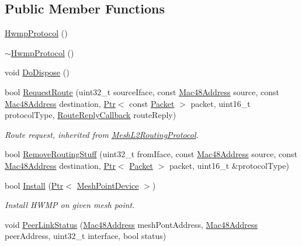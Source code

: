 \subsection*{Public Member Functions}
\begin{DoxyCompactItemize}
\item 
\hyperlink{classns3_1_1dot11s_1_1HwmpProtocol_afe4408ad645b5c3daebd66391fb27b9d}{Hwmp\+Protocol} ()
\item 
\hyperlink{classns3_1_1dot11s_1_1HwmpProtocol_acd6ad97112fd1b32f1d665376bb602cc}{$\sim$\+Hwmp\+Protocol} ()
\item 
void \hyperlink{classns3_1_1dot11s_1_1HwmpProtocol_aac4d06dc3a17b2afbe75104b78f1363a}{Do\+Dispose} ()
\item 
bool \hyperlink{classns3_1_1dot11s_1_1HwmpProtocol_aedaf2770cdde104e445b870fd9b37617}{Request\+Route} (uint32\+\_\+t source\+Iface, const \hyperlink{classns3_1_1Mac48Address}{Mac48\+Address} source, const \hyperlink{classns3_1_1Mac48Address}{Mac48\+Address} destination, \hyperlink{classns3_1_1Ptr}{Ptr}$<$ const \hyperlink{classns3_1_1Packet}{Packet} $>$ packet, uint16\+\_\+t protocol\+Type, \hyperlink{classns3_1_1MeshL2RoutingProtocol_a4c415efa22789b3a3bb5538b8fcf3e6a}{Route\+Reply\+Callback} route\+Reply)
\begin{DoxyCompactList}\small\item\em Route request, inherited from \hyperlink{classns3_1_1MeshL2RoutingProtocol}{Mesh\+L2\+Routing\+Protocol}. \end{DoxyCompactList}\item 
bool \hyperlink{classns3_1_1dot11s_1_1HwmpProtocol_a582849ca436be390570c98267d512972}{Remove\+Routing\+Stuff} (uint32\+\_\+t from\+Iface, const \hyperlink{classns3_1_1Mac48Address}{Mac48\+Address} source, const \hyperlink{classns3_1_1Mac48Address}{Mac48\+Address} destination, \hyperlink{classns3_1_1Ptr}{Ptr}$<$ \hyperlink{classns3_1_1Packet}{Packet} $>$ packet, uint16\+\_\+t \&protocol\+Type)
\item 
bool \hyperlink{classns3_1_1dot11s_1_1HwmpProtocol_ab8041a5b50c6ca47ffbcc751032856c3}{Install} (\hyperlink{classns3_1_1Ptr}{Ptr}$<$ \hyperlink{classns3_1_1MeshPointDevice}{Mesh\+Point\+Device} $>$)
\begin{DoxyCompactList}\small\item\em Install H\+W\+MP on given mesh point. \end{DoxyCompactList}\item 
void \hyperlink{classns3_1_1dot11s_1_1HwmpProtocol_a7ebcbc95e74731ece41e1ee5df33c9ce}{Peer\+Link\+Status} (\hyperlink{classns3_1_1Mac48Address}{Mac48\+Address} mesh\+Pont\+Address, \hyperlink{classns3_1_1Mac48Address}{Mac48\+Address} peer\+Address, uint32\+\_\+t interface, bool status)

\end{DoxyCompactItemize}
